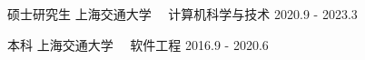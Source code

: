 


\begin{cventries}


\cventry
{硕士研究生} %
{上海交通大学 \ \textbullet\ 计算机科学与技术} %
{} %
{2020.9 - 2023.3} %
{ %
}

\vspace{-6mm}

\cventry
{本科} %
{上海交通大学 \ \textbullet\ 软件工程} %
{} %
{2016.9 - 2020.6} %
{ %
\begin{cvitems}
\end{cvitems}
}


\end{cventries}

\vspace{-4mm}
